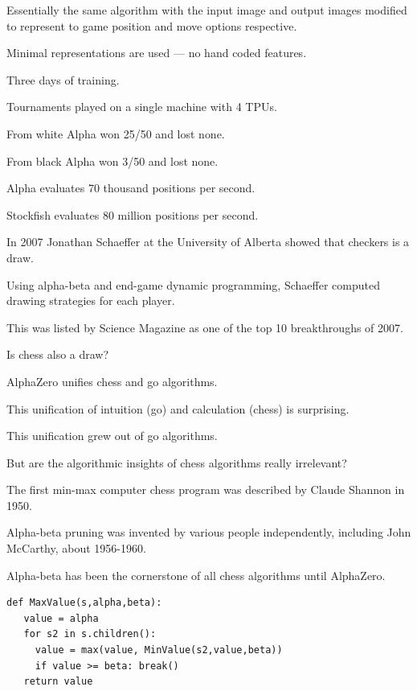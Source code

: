 {

Essentially the same algorithm with the input image and output images modified to represent to game position and move options respective.

\vfill
Minimal representations are used --- no hand coded features.

\vfill
Three days of training.

\vfill
Tournaments played on a single machine with 4 TPUs.


From white Alpha won 25/50 and lost none.

\vfill
From black Alpha won 3/50 and lost none.

\vfill
Alpha evaluates 70 thousand positions per second.

\vfill
Stockfish evaluates 80 million positions per second.


In 2007 Jonathan Schaeffer at the University of Alberta showed that checkers is a draw.

\vfill
Using alpha-beta and end-game dynamic programming, Schaeffer computed drawing strategies for each player.

\vfill
This was listed by Science Magazine as one of the top 10 breakthroughs of 2007.

\vfill
Is chess also a draw?


AlphaZero unifies chess and go algorithms.

\vfill
This unification of intuition (go) and calculation (chess) is surprising.

\vfill
This unification grew out of go algorithms.

\vfill
But are the algorithmic insights of chess algorithms really irrelevant?


The first min-max computer chess program was described by Claude Shannon in 1950.

\vfill
Alpha-beta pruning was invented by various people independently, including John McCarthy, about 1956-1960.

\vfill
Alpha-beta has been the cornerstone of all chess algorithms until AlphaZero.



\begin{verbatim}
def MaxValue(s,alpha,beta):
   value = alpha
   for s2 in s.children():
     value = max(value, MinValue(s2,value,beta))
     if value >= beta: break()
   return value


\end{verbatim}}
